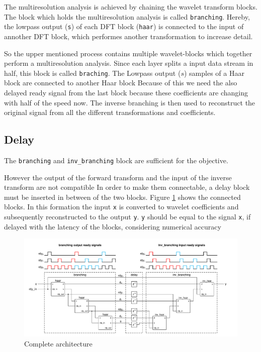 \begin{refsection}
The multiresolution analysis is achieved by chaining the wavelet transform blocks.
The block which holds the multiresolution analysis is called \texttt{branching}.
Hereby, the lowpass output (\texttt{s}) of each DFT block (\texttt{haar}) is connected to the input of annother DFT block, which performes another transformation to increase detail. 


So the upper mentioned process contains multiple wavelet-blocks which together perform a multiresolution analysis.
Since each layer splits a input data stream in half, this block is called \texttt{braching}.
The Lowpass output ($s$) samples of a Haar block are connected to another Haar block 
Because of this we need the also delayed ready signal from the last block because these coefficients are changing with half of the speed now. 
The inverse branching is then used to reconstruct the original signal from all the different transformations and coefficients.


\subsection{Delay}

The \texttt{branching} and \texttt{inv\_branching} block are sufficient for the objective. %

However the output of the forward transform and the input of the inverse transform are not compatible
In order to make them connectable, a delay block must be inserted in between of the two blocks.
Figure \ref{fpga:fig:mainDelay} shows the connected blocks.
In this formation the input \texttt{x} is converted to wavelet coefficients and subsequently reconstructed to the output \texttt{y}.
\texttt{y} should be equal to the signal \texttt{x}, if delayed with the latency of the blocks, considering numerical accuracy
\begin{figure}
	\centering
	\includegraphics[width=\textwidth]{papers/fpga/images/main_delay.pdf}
	\caption{Complete architecture \label{fpga:fig:mainDelay}}
\end{figure}



\end{refsection}
